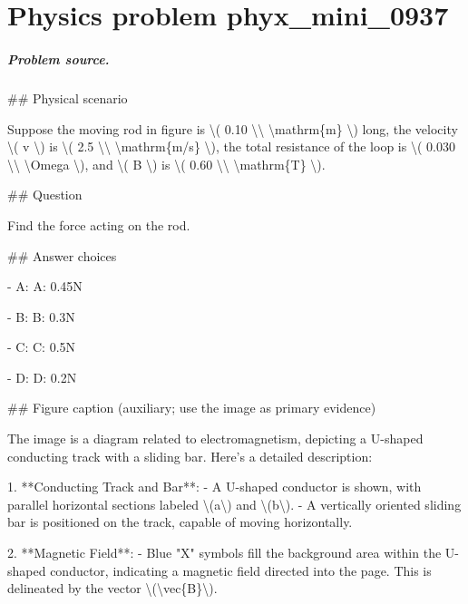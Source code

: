 
\chapter{Physics problem phyx\_mini\_0937}
\label{ch:PhyXMiniProblems_problem_phyx_mini_0937}

\paragraph{Problem source.}
\#\# Physical scenario

Suppose the moving rod in figure is \textbackslash{}( 0.10 \textbackslash{}\textbackslash{} \textbackslash{}mathrm\{m\} \textbackslash{}) long, the velocity \textbackslash{}( v \textbackslash{}) is \textbackslash{}( 2.5 \textbackslash{}\textbackslash{} \textbackslash{}mathrm\{m/s\} \textbackslash{}), the total resistance of the loop is \textbackslash{}( 0.030 \textbackslash{}\textbackslash{} \textbackslash{}Omega \textbackslash{}), and \textbackslash{}( B \textbackslash{}) is \textbackslash{}( 0.60 \textbackslash{}\textbackslash{} \textbackslash{}mathrm\{T\} \textbackslash{}).

\#\# Question

Find the force acting on the rod.

\#\# Answer choices

- A: A: 0.45N

- B: B: 0.3N

- C: C: 0.5N

- D: D: 0.2N

\#\# Figure caption (auxiliary; use the image as primary evidence)

The image is a diagram related to electromagnetism, depicting a U-shaped conducting track with a sliding bar. Here's a detailed description:

1. **Conducting Track and Bar**:
   - A U-shaped conductor is shown, with parallel horizontal sections labeled \textbackslash{}(a\textbackslash{}) and \textbackslash{}(b\textbackslash{}).
   - A vertically oriented sliding bar is positioned on the track, capable of moving horizontally.

2. **Magnetic Field**:
   - Blue "X" symbols fill the background area within the U-shaped conductor, indicating a magnetic field directed into the page. This is delineated by the vector \textbackslash{}(\textbackslash{}vec\{B\}\textbackslash{}).

